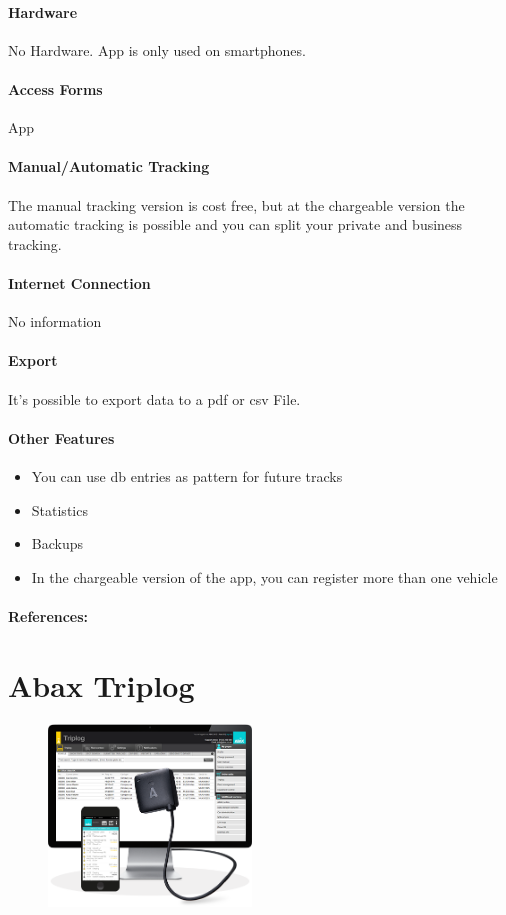 \paragraph{Hardware} No Hardware. App is only used on smartphones.
\paragraph{Access Forms} App
\paragraph{Manual/Automatic Tracking} The manual tracking version is cost free, but at the chargeable version the automatic tracking is possible and you can split your private and business tracking.
\paragraph{Internet Connection} No information
\paragraph{Export} It’s possible to export data to a \gls{pdf} or \gls{csv} File.
\paragraph{Other Features} 
\begin{itemize}
\item You can use \gls{db} entries as pattern for future tracks
\item Statistics
\item Backups
\item In the chargeable version of the app, you can register more than one vehicle
\end{itemize}
\paragraph{References:} \cite{Drives_Fahrtenbuch}
\newpage

\section{Abax Triplog}
\begin{figure}
  \begin{center}
    \includegraphics[width=0.48\textwidth]{bilder/abax}
  \end{center}
\end{figure}

